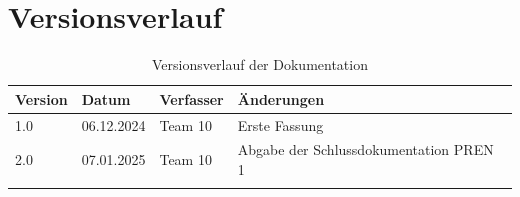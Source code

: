 \documentclass{scrarticle}                %
\begin{document}
\newpage


\section*{Versionsverlauf}

\thispagestyle{nofooter}

\begin{longtable}{|p{2cm}|p{3cm}|p{3cm}|p{5cm}|}
    \hline
    \textbf{Version} & \textbf{Datum} & \textbf{Verfasser} & \textbf{Änderungen}                    \\
    \hline
    1.0              & 06.12.2024     & Team 10            & Erste Fassung                          \\
    \hline
    2.0              & 07.01.2025     & Team 10            & Abgabe der Schlussdokumentation PREN 1 \\
    \hline
    \caption{Versionsverlauf der Dokumentation}
\end{longtable}

\newpage



\thispagestyle{nofooter}
\newpage

\tableofcontents
\thispagestyle{nofooter}
\newpage

\setcounter{page}{1}


\newpage


\newpage


\newpage


\newpage


\newpage


\newpage


\newpage


\newpage
\end{document}
